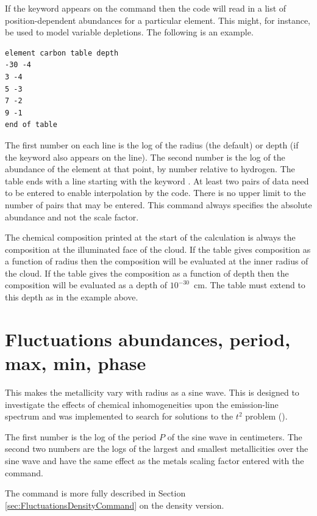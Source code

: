 If the keyword  appears on
the  command then the code
will read in a list of position-dependent abundances for
a particular element.
This might, for instance, be used to model variable depletions.
The following is an example.
\begin{verbatim}
element carbon table depth
-30 -4
3 -4
5 -3
7 -2
9 -1
end of table
\end{verbatim}

The first number on each line is the log of the radius (the default)
or depth (if the keyword  also appears
on the  line).
The second number is the
log of the abundance of the element at that point, by number relative to
hydrogen.
The table ends with a line starting with the keyword
.
At least two pairs of data need to be entered to enable interpolation by the code.
There is no upper limit to the number of pairs that may be entered.
This command always specifies the absolute
abundance and not the scale factor.

The chemical composition printed at the start of the calculation is always
the composition at the illuminated face of the cloud.  If the table gives
composition as a function of radius then the composition will be evaluated
at the inner radius of the cloud.  If the table gives the composition as
a function of depth then the composition will be evaluated as a depth of
$10^{-30}$~cm.  The table must extend to this depth as in the example above.

\section{Fluctuations abundances, period, max, min, phase}
\label{sec:FluctuationsAbundanceCommand}

This makes the metallicity vary with radius as a sine wave.  This is
designed to investigate the effects of chemical inhomogeneities upon the
emission-line spectrum and was implemented to search for solutions to the
$t^2$ problem (\citealp{KingdonFerland1995}).

The first number is the log of the period $P$ of the sine wave in
centimeters.
The second two numbers are the logs of the largest and smallest
metallicities over the sine wave and have the same effect as the metals
scaling factor entered with the  command.

The  command is more fully described in
Section \ref{sec:FluctuationsDensityCommand} on the density version.

